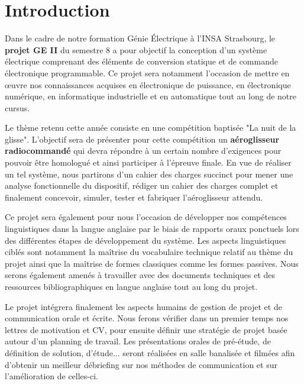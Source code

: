 \chapter{Introduction}
	
	Dans le cadre de notre formation Génie Électrique à l'INSA Strasbourg, le \textbf{projet GE II} du semestre 8 a pour objectif la conception d'un système électrique comprenant des éléments de conversion statique et de commande électronique programmable. Ce projet sera notamment l'occasion de mettre en œuvre nos connaissances acquises en électronique de puissance, en électronique numérique, en informatique industrielle et en automatique tout au long de notre cursus. 
	
	Le thème retenu cette année consiste en une compétition baptisée "La nuit de la glisse". L'objectif sera de présenter pour cette compétition un \textbf{aéroglisseur radiocommandé} qui devra répondre à un certain nombre d'exigences pour pouvoir être homologué et ainsi participer à l'épreuve finale. En vue de réaliser un tel système, nous partirons d'un cahier des charges succinct pour mener une analyse fonctionnelle du dispositif, rédiger un cahier des charges complet et finalement concevoir, simuler, tester et fabriquer l'aéroglisseur attendu.
	
	Ce projet sera également pour nous l'occasion de développer nos compétences linguistiques dans la langue anglaise par le biais de rapports oraux ponctuels lors des différentes étapes de développement du système. Les aspects linguistiques ciblés sont notamment la maîtrise du vocabulaire technique relatif au thème du projet ainsi que la maîtrise de formes classiques comme les formes passives. Nous serons également amenés à travailler avec des documents techniques et des ressources bibliographiques en langue anglaise tout au long du projet.
	
	Le projet intégrera finalement les aspects humains de gestion de projet et de communication orale et écrite. Nous ferons vérifier dans un premier temps nos lettres de motivation et CV, pour ensuite définir une stratégie de projet basée autour d'un planning de travail. Les présentations orales de pré-étude, de définition de solution, d'étude... seront réalisées en salle banalisée et filmées afin d'obtenir un meilleur débriefing sur nos méthodes de communication et sur l'amélioration de celles-ci.
	
